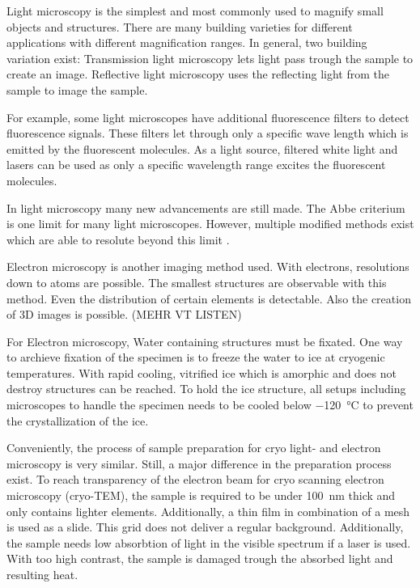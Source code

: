 

Light microscopy is the simplest and most commonly used to magnify small objects and structures. There are many building varieties for different applications with different magnification ranges. In general, two building variation exist: Transmission light microscopy lets light pass trough the sample to create an image. Reflective light microscopy uses the reflecting light from the sample to image the sample. 

For example, some light microscopes have additional fluorescence filters to detect fluorescence signals. These filters let through only a specific wave length which is emitted by the fluorescent molecules. As a light source, filtered white light and lasers can be used as only a specific wavelength range excites the fluorescent molecules.

In light microscopy many new advancements are still made. The Abbe criterium is one limit for many light microscopes. However, multiple modified methods exist which are able to resolute beyond this limit \cite{Heintzmann.2006}.

Electron microscopy is another imaging method used. With electrons, resolutions down to atoms are possible. The smallest structures are observable with this method. Even the distribution of certain elements is detectable. Also the creation of 3D images is possible. (MEHR VT LISTEN)

For Electron microscopy, Water containing structures must be fixated. One way to archieve fixation of the specimen is to freeze the water to ice at cryogenic temperatures. With rapid cooling, vitrified ice which is amorphic and does not destroy structures can be reached. To hold the ice structure, all setups including microscopes to handle the specimen needs to be cooled below \SI{-120}{\degreeCelsius} to prevent the crystallization of the ice.

Conveniently, the process of sample preparation for cryo light- and electron microscopy is very similar. Still, a major difference in the preparation process exist. To reach transparency of the electron beam for cryo scanning electron microscopy (cryo-TEM), the sample is required to be under \SI{100}{\nano\meter} thick and only contains lighter elements. Additionally, a thin film in combination of a mesh is used as a slide. This grid does not deliver a regular background. Additionally, the sample needs low absorbtion of light in the visible spectrum if a laser is used. With too high contrast, the sample is damaged trough the absorbed light and resulting heat.

